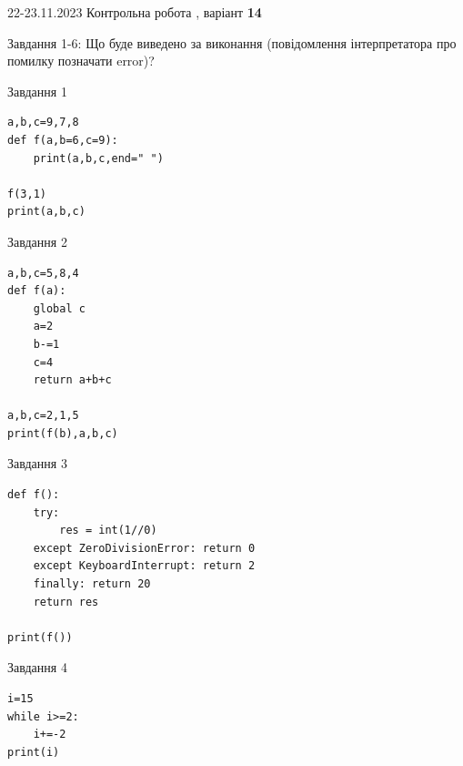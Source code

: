 \documentclass[12pt, ukrainian]{article}
\begin{document}
{{22-23.11.2023 Контрольна робота , варіант  \No \textbf { 14 }\par}}
{

Завдання 1-6: Що буде виведено за виконання (повідомлення інтерпретатора про помилку позначати error)?


\begin{minipage}[t]{9.7cm}                
{\begin{center}Завдання {1}\end{center}}
\begin{verbatim}
a,b,c=9,7,8
def f(a,b=6,c=9):
    print(a,b,c,end=" ")

f(3,1)
print(a,b,c)
\end{verbatim}     
\end{minipage}
\vline \hspace{8mm}
\begin{minipage}[t]{8.0cm}                
{\begin{center}Завдання {2}\end{center}}
\begin{verbatim}
a,b,c=5,8,4
def f(a):
    global c
    a=2
    b-=1
    c=4
    return a+b+c

a,b,c=2,1,5
print(f(b),a,b,c)
\end{verbatim}     
\end{minipage}

\vspace{15mm}
\begin{minipage}[t]{9.7cm}                
{\begin{center}Завдання {3}\end{center}}
\begin{verbatim}
def f():
    try:
        res = int(1//0)
    except ZeroDivisionError: return 0
    except KeyboardInterrupt: return 2
    finally: return 20
    return res

print(f())
\end{verbatim}     
\end{minipage}
\vline \hspace{8mm}
\begin{minipage}[t]{8.0cm}                
{\begin{center}Завдання {4}\end{center}}
\begin{verbatim}
i=15
while i>=2:
    i+=-2
print(i)
\end{verbatim}     
\end{minipage}

}
\end{document}
